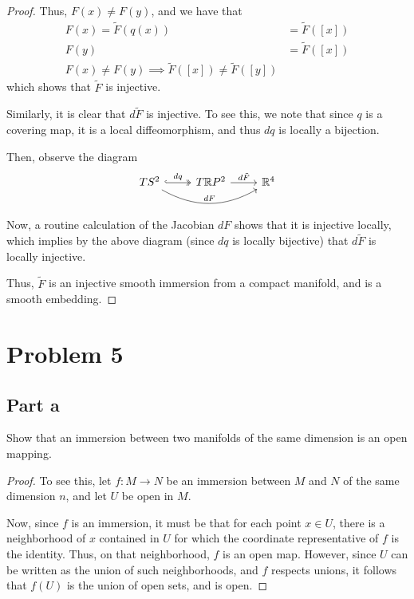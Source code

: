 \documentclass[fontsize=11pt]{scrartcl} %
\numberwithin{equation}{section} %
\numberwithin{figure}{section} %
\numberwithin{table}{section} %
\newcommand{\R}{\mathbb{R}}
\begin{document}
\begin{proof}
Thus, $F(x)\neq F(y)$, and we have that
\[
\begin{aligned}
F(x) = \tilde{F}(q(x)) &= \tilde{F}([x])\\
F(y) &= \tilde{F}([x])\\
F(x)\neq F(y) \implies \tilde{F}([x])\neq\tilde{F}([y])
\end{aligned}
\]
which shows that $\tilde{F}$ is injective.

Similarly, it is clear that $d\tilde{F}$ is injective. To see this, we note that
since $q$ is a covering map, it is a local diffeomorphism, and thus $dq$ is locally
a bijection.

Then, observe the diagram
\[
\begin{tikzcd}
TS^2\arrow[bend right]{rr}{dF} \arrow[hook, two heads]{r}{dq} & T\R P^2 \arrow{r}{d\tilde{F}} & \R^4\\
\end{tikzcd}
\]
Now, a routine calculation of the Jacobian $dF$ shows that it is injective locally,
which implies by the above diagram (since $dq$ is locally bijective) that $d\tilde{F}$ is
locally injective. 

Thus, $\tilde{F}$ is an injective smooth immersion from a compact manifold, and is
a smooth embedding.
\end{proof}

\newpage
\section*{Problem 5}

\subsection*{Part a}
Show that an immersion between two manifolds of the same dimension is an open mapping.
\\
\begin{proof}
To see this, let $f:M\to N$ be an immersion between $M$ and $N$ of the same dimension $n$,
and let $U$ be open in $M$.

Now, since $f$ is an immersion, it must be that for each point $x\in U$, there is a neighborhood
of $x$ contained in $U$ for which the coordinate representative of $f$ is the identity. Thus,
on that neighborhood, $f$ is an open map. However, since $U$ can be written as the union of such
neighborhoods, and $f$ respects unions, it follows that $f(U)$ is the union of open sets, and is
open.
\end{proof}
\end{document}
